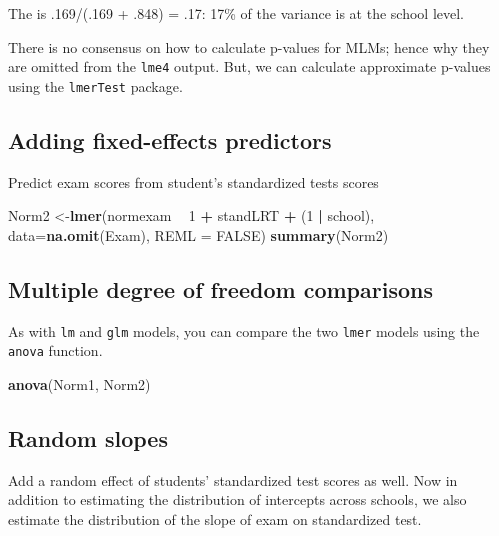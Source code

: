 \documentclass[]{book}
\newenvironment{Shaded}{\begin{snugshade}}{\end{snugshade}}
\newcommand{\KeywordTok}[1]{\textcolor[rgb]{0.13,0.29,0.53}{\textbf{#1}}}
\newcommand{\DataTypeTok}[1]{\textcolor[rgb]{0.13,0.29,0.53}{#1}}
\newcommand{\DecValTok}[1]{\textcolor[rgb]{0.00,0.00,0.81}{#1}}
\newcommand{\StringTok}[1]{\textcolor[rgb]{0.31,0.60,0.02}{#1}}
\newcommand{\OtherTok}[1]{\textcolor[rgb]{0.56,0.35,0.01}{#1}}
\newcommand{\OperatorTok}[1]{\textcolor[rgb]{0.81,0.36,0.00}{\textbf{#1}}}
\newcommand{\NormalTok}[1]{#1}
\begin{document}
The is .169/(.169 + .848) = .17: 17\% of the variance is at the school
level.

There is no consensus on how to calculate p-values for MLMs; hence why
they are omitted from the \texttt{lme4} output. But, we can calculate
approximate p-values using the \texttt{lmerTest} package.

\subsection{Adding fixed-effects
predictors}\label{adding-fixed-effects-predictors}

Predict exam scores from student's standardized tests scores

\begin{Shaded}
\begin{Highlighting}[]
\NormalTok{  Norm2 <-}\KeywordTok{lmer}\NormalTok{(normexam }\OperatorTok{~}\StringTok{ }\DecValTok{1} \OperatorTok{+}\StringTok{ }\NormalTok{standLRT }\OperatorTok{+}\StringTok{ }\NormalTok{(}\DecValTok{1} \OperatorTok{|}\StringTok{ }\NormalTok{school),}
               \DataTypeTok{data=}\KeywordTok{na.omit}\NormalTok{(Exam), }\DataTypeTok{REML =} \OtherTok{FALSE}\NormalTok{) }
  \KeywordTok{summary}\NormalTok{(Norm2) }
\end{Highlighting}
\end{Shaded}

\subsection{Multiple degree of freedom
comparisons}\label{multiple-degree-of-freedom-comparisons}

As with \texttt{lm} and \texttt{glm} models, you can compare the two
\texttt{lmer} models using the \texttt{anova} function.

\begin{Shaded}
\begin{Highlighting}[]
  \KeywordTok{anova}\NormalTok{(Norm1, Norm2)}
\end{Highlighting}
\end{Shaded}

\subsection{Random slopes}\label{random-slopes}

Add a random effect of students' standardized test scores as well. Now
in addition to estimating the distribution of intercepts across schools,
we also estimate the distribution of the slope of exam on standardized
test.
\end{document}
